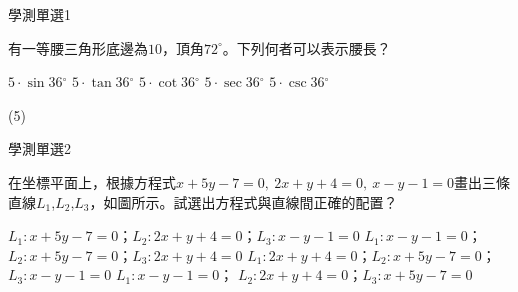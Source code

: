 \begin{QUESTIONS}
    \begin{QUESTION}
        \begin{ExamInfo}{89}{學測}{單選}{1}
        \end{ExamInfo}
        \begin{ExamAnsRateInfo}{}{}{}{}
        \end{ExamAnsRateInfo}
        \begin{QBODY}
            有一等腰三角形底邊為$10$，頂角$72^\circ$。下列何者可以表示腰長？
            \begin{QOPS}
                \QOP $5\cdot \sin 36{}^\circ $
                \QOP $5\cdot \tan 36{}^\circ $
                \QOP $5\cdot \cot 36{}^\circ $
                \QOP $5\cdot \sec 36{}^\circ $
                \QOP $5\cdot \csc 36{}^\circ $
            \end{QOPS}
        \end{QBODY}
        \begin{QFROMS}
        \end{QFROMS}
        \begin{QTAGS}\end{QTAGS}
        \begin{QANS}
		(5)
        \end{QANS}
        \begin{QSOLLIST}
        \end{QSOLLIST}
        \begin{QEMPTYSPACE}
        \end{QEMPTYSPACE}
    \end{QUESTION}
    \begin{QUESTION}
        \begin{ExamInfo}{89}{學測}{單選}{2}
        \end{ExamInfo}
        \begin{ExamAnsRateInfo}{}{}{}{}
        \end{ExamAnsRateInfo}
        \begin{QBODY}
            在坐標平面上，根據方程式$x+5y-7=0,\ 2x+y+4=0,\ x-y-1=0$畫出三條直線$L_1$,$L_2$,$L_3$，如圖所示。試選出方程式與直線間正確的配置？
            \begin{QOPS}
                \QOP $L_1:x+5y-7=0$；$L_2:2x+y+4=0$；$L_3:x-y-1=0$
                \QOP $L_1:x-y-1=0$； $L_2:x+5y-7=0$；$L_3:2x+y+4=0$
                \QOP $L_1:2x+y+4=0$；$L_2:x+5y-7=0$；$L_3:x-y-1=0$
                \QOP $L_1:x-y-1=0$； $L_2:2x+y+4=0$；$L_3:x+5y-7=0$

\end{QOPS}
\end{QBODY}
\end{QUESTION}
\end{QUESTIONS}
